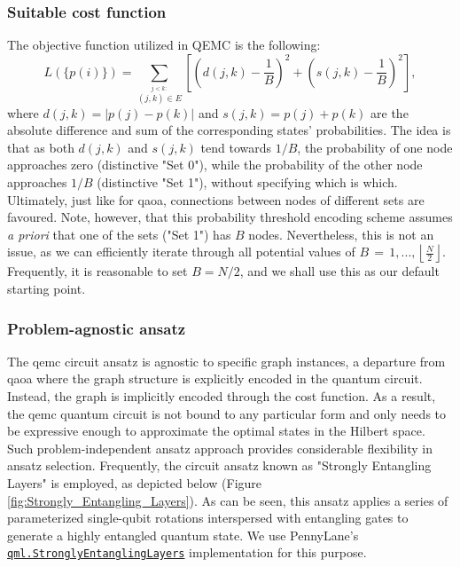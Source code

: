 \subsubsection*{\small Suitable cost function}
The objective function utilized in QEMC is the following:
\begin{equation}
L(\{p(i)\}) = \sum_{\stackrel{j < k:}{(j,k)\in E}}\left[\left(d(j,k)-\frac{1}{B}\right)^{2}+\left(s(j,k)-\frac{1}{B}\right)^{2}\right],
\end{equation}
where $d(j,k) = |p(j) - p(k)|$ and $s(j, k) = p(j) + p(k)$ are the absolute difference and sum of the corresponding states' probabilities. The idea is that as both $d(j, k)$ and $s(j, k)$ tend towards $1/B$, the probability of one node approaches zero (distinctive "Set 0"), while the probability of the other node approaches $1/B$ (distinctive "Set 1"), without specifying which is which. Ultimately, just like for \acrshort{qaoa}, connections between nodes of different sets are favoured. Note, however, that this probability threshold encoding scheme assumes \textit{a priori} that one of the sets ("Set 1") has $B$ nodes. Nevertheless, this is not an issue, as we can efficiently iterate through all potential values of $B\,=\,1,...,\left\lfloor{\frac{N}{2}}\right\rfloor$. Frequently, it is reasonable to set $B = N/2$, and we shall use this as our default starting point.

\subsubsection*{\small Problem-agnostic ansatz}
The \acrshort{qemc} circuit ansatz is agnostic to specific graph instances, a departure from \acrshort{qaoa} where the graph structure is explicitly encoded in the quantum circuit. Instead, the graph is implicitly encoded through the cost function. As a result, the \acrshort{qemc} quantum circuit is not bound to any particular form and only needs to be expressive enough to approximate the optimal states in the Hilbert space. Such problem-independent ansatz approach provides considerable flexibility in ansatz selection. Frequently, the circuit ansatz known as "Strongly Entangling Layers" is employed, as depicted below (Figure \ref{fig:Strongly_Entangling_Layers}). As can be seen, this ansatz applies a series of parameterized single-qubit rotations interspersed with entangling gates to generate a highly entangled quantum state. We use PennyLane's \href{https://docs.pennylane.ai/en/stable/code/api/pennylane.StronglyEntanglingLayers.html}{\texttt{qml.StronglyEntanglingLayers}} implementation for this purpose.

